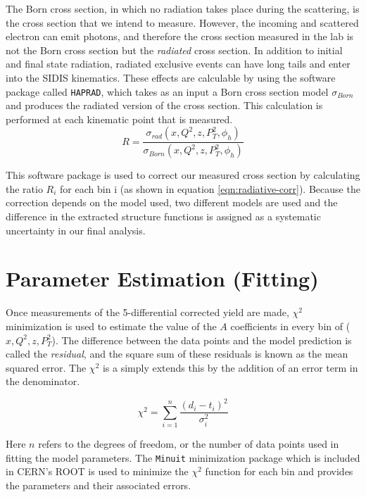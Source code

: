 The Born cross section, in which no radiation takes place during the scattering, is the cross section that we intend to measure.  However, the incoming and scattered electron can emit photons, and therefore the cross section measured in the lab is not the Born cross section but the \textit{radiated} cross section.  In addition to initial and final state radiation, radiated exclusive events can have long tails and enter into the SIDIS kinematics.  These effects are calculable by using the software package called \texttt{HAPRAD}, which takes as an input a Born cross section model $\sigma_{Born}$ and produces the radiated version of the cross section. This calculation is performed at each kinematic point that is measured.  \\

\begin{equation}
	\label{eqn:radiative-corr}
	R = \frac{\sigma_{rad} (x, Q^2, z, P_T^2, \phi_h)}{\sigma_{Born} (x, Q^2, z, P_T^2, \phi_h)}
\end{equation}

This software package is used to correct our measured cross section by calculating the ratio $R_{i}$ for each bin i (as shown in equation \ref{eqn:radiative-corr}).  Because the correction depends on the model used, two different models are used and the difference in the extracted structure functions is assigned as a systematic uncertainty in our final analysis.

\section{Parameter Estimation (Fitting)}
Once measurements of the 5-differential corrected yield are made, $\chi^2$ minimization is used to estimate the value of the $A$ coefficients in every bin of ($x, Q^2, z, P_T^2$).  The difference between the data points and the model prediction is called the \textit{residual}, and the square sum of these residuals is known as the mean squared error.  The $\chi^2$ is a simply extends this by the addition of an error term in the denominator.

\begin{equation}
	\chi^2 = \sum_{i = 1}^{n} \frac{(d_i - t_i)^2}{\sigma_i^2}
\end{equation}  

Here $n$ refers to the degrees of freedom, or the number of data points used in fitting the model parameters.  The \texttt{Minuit} minimization package which is included in CERN's ROOT is used to minimize the $\chi^2$ function for each bin and provides the parameters and their associated errors.

